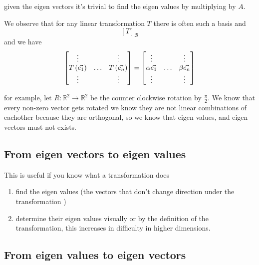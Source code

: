 \documentclass[11pt]{book}
\begin{document}
\begin{remark}
    given the eigen vectors it's trivial to find the eigen values by multiplying by $A$.
\end{remark}

\begin{remark}
    We observe that for any linear transformation $T$ there is often such a basis and 
    \[
    \left[ T \right]_{\mathcal{B}} 
    \]
    and we have 
    \[
    \mat[b]{ \vdots  &  & \vdots  \\ T\left(\vec{e_1} \right)  & \ldots  & T\left(\vec{e_{n} } \right)  \\ \vdots  &  & \vdots  }= \mat[b]{ \vdots  &  & \vdots  \\ \alpha \vec{e_1}  & \ldots  & \beta \vec{e_{n} }  \\ \vdots  &  & \vdots  }
    \]
\end{remark}
\begin{eg}
    for example, let $R : \mathbb{R} ^2  \to \mathbb{R} ^2  $ be the counter clockwise rotation by $\frac{\pi }{2}$. We know that every non-zero vector gets rotated we know they are not linear combinations of eachother because they are orthogonal, so we know that eigen values, and eigen vectors must not exists. 
\end{eg}

\subsection{From eigen vectors to eigen values }%
\label{sub:from_eigen_vectors_to_eigen_values_}

This is useful if you know what a transformation does

\begin{enumerate}
    \item find the eigen values (the vectors that don't change direction under the transformation )
    \item determine their eigen values visually or by the definition of the transformation, this increases in difficulty in higher dimensions. 
\end{enumerate}

\subsection{From eigen values to eigen vectors }%
\label{sub:from_eigen_values_to_eigen_vectors_}
\end{document}
